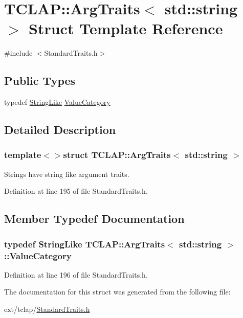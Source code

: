 \hypertarget{struct_t_c_l_a_p_1_1_arg_traits_3_01std_1_1string_01_4}{}\section{T\+C\+L\+A\+P\+:\+:Arg\+Traits$<$ std\+:\+:string $>$ Struct Template Reference}
\label{struct_t_c_l_a_p_1_1_arg_traits_3_01std_1_1string_01_4}


{\ttfamily \#include $<$Standard\+Traits.\+h$>$}

\subsection*{Public Types}
\begin{DoxyCompactItemize}
\item 
typedef \hyperlink{struct_t_c_l_a_p_1_1_string_like}{String\+Like} \hyperlink{struct_t_c_l_a_p_1_1_arg_traits_3_01std_1_1string_01_4_a719adeb18786516dd4b2a16525cf4536}{Value\+Category}
\end{DoxyCompactItemize}


\subsection{Detailed Description}
\subsubsection*{template$<$$>$struct T\+C\+L\+A\+P\+::\+Arg\+Traits$<$ std\+::string $>$}

Strings have string like argument traits. 

Definition at line 195 of file Standard\+Traits.\+h.



\subsection{Member Typedef Documentation}
\hypertarget{struct_t_c_l_a_p_1_1_arg_traits_3_01std_1_1string_01_4_a719adeb18786516dd4b2a16525cf4536}{}
\subsubsection[{Value\+Category}]{\setlength{\rightskip}{0pt plus 5cm}typedef {\bf String\+Like} {\bf T\+C\+L\+A\+P\+::\+Arg\+Traits}$<$ std\+::string $>$\+::{\bf Value\+Category}}\label{struct_t_c_l_a_p_1_1_arg_traits_3_01std_1_1string_01_4_a719adeb18786516dd4b2a16525cf4536}


Definition at line 196 of file Standard\+Traits.\+h.



The documentation for this struct was generated from the following file\+:\begin{DoxyCompactItemize}
\item 
ext/tclap/\hyperlink{_standard_traits_8h}{Standard\+Traits.\+h}\end{DoxyCompactItemize}
